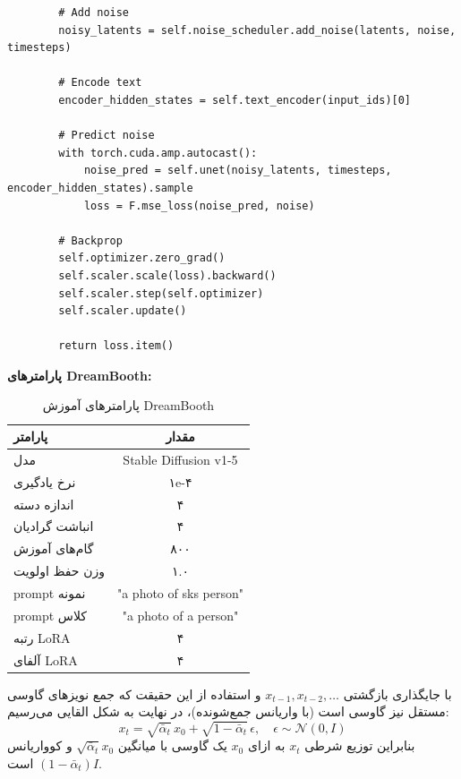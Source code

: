 \begin{verbatim}
        # Add noise
        noisy_latents = self.noise_scheduler.add_noise(latents, noise, timesteps)
        
        # Encode text
        encoder_hidden_states = self.text_encoder(input_ids)[0]
        
        # Predict noise
        with torch.cuda.amp.autocast():
            noise_pred = self.unet(noisy_latents, timesteps, encoder_hidden_states).sample
            loss = F.mse_loss(noise_pred, noise)
        
        # Backprop
        self.optimizer.zero_grad()
        self.scaler.scale(loss).backward()
        self.scaler.step(self.optimizer)
        self.scaler.update()
        
        return loss.item()
\end{verbatim}

\textbf{پارامترهای DreamBooth:}
\begin{table}[H]
    \centering
    \begin{tabular}{lc}
        \toprule
        \textbf{پارامتر} & \textbf{مقدار} \\
        \midrule
        مدل & Stable Diffusion v1-5 \\
        نرخ یادگیری & ۱e-۴ \\
        اندازه دسته & ۴ \\
        انباشت گرادیان & ۴ \\
        گام‌های آموزش & ۸۰۰ \\
        وزن حفظ اولویت & ۱.۰ \\
        prompt نمونه & "a photo of sks person" \\
        prompt کلاس & "a photo of a person" \\
        رتبه LoRA & ۴ \\
        آلفای LoRA & ۴ \\
        \bottomrule
    \end{tabular}
    \caption{پارامترهای آموزش DreamBooth}
\end{table}
با جایگذاری بازگشتی $x_{t-1},x_{t-2},\dots$ و استفاده از این حقیقت که جمع نویزهای گاوسی مستقل نیز گاوسی است (با واریانس جمع‌شونده)، در نهایت به شکل القایی می‌رسیم:
\begin{equation}
x_t=\sqrt{\bar{\alpha}_t}\,x_0+\sqrt{1-\bar{\alpha}_t}\,\epsilon,\quad \epsilon\sim\mathcal{N}(0,I)
\end{equation}
بنابراین توزیع شرطی $x_t$ به ازای $x_0$ یک گاوسی با میانگین $\sqrt{\bar{\alpha}_t}x_0$ و کوواریانس $(1-\bar{\alpha}_t)I$ است.

